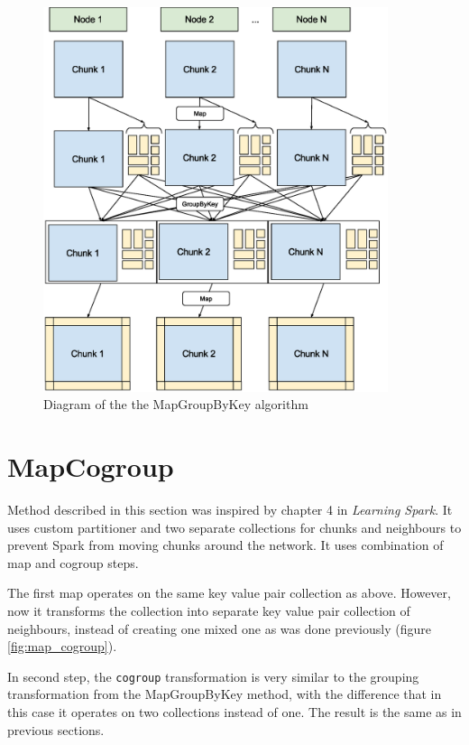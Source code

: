 \documentclass{l4proj}
\begin{document}
\begin{figure}
\centering
\includegraphics[width=0.9\textwidth]{images/MapGroup.eps}
\caption{Diagram of the the MapGroupByKey algorithm}
\label{fig:map_group}
\end{figure}

\section{MapCogroup}

Method described in this section was inspired by chapter 4 in \textit{Learning Spark}\cite{learning_spark}.
It uses custom partitioner and two separate collections for chunks and neighbours
to prevent Spark from moving chunks around the network. It uses combination
of map and cogroup steps.

The first map operates on the same key value pair collection as above. However,
now it transforms the collection into separate key value pair collection of neighbours,
instead of creating one mixed one as was done previously (figure \ref{fig:map_cogroup}).

In second step, the \texttt{cogroup} transformation is very similar to the grouping transformation
from the MapGroupByKey method, with the difference that in this case it operates on two collections 
instead of one. The result is the same as in previous sections.
\end{document}
